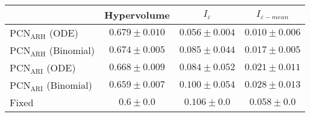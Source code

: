 \begin{tabular}{|l|c|c|c|}
    \hline
        & Hypervolume & $I_\varepsilon$ & $I_{\varepsilon-mean}$ \\
    \hline
        $\text{PCN}_\text{ARH}$ (ODE) & $\mathbf{0.679 \pm 0.010}$ & $\mathbf{0.056 \pm 0.004}$ & $\mathbf{0.010 \pm 0.006}$ \\
        \hline
        $\text{PCN}_\text{ARH}$ (Binomial) & $0.674 \pm 0.005$ & $0.085 \pm 0.044$ & $0.017 \pm 0.005$ \\
        \hline
        $\text{PCN}_\text{ARI}$ (ODE) & $0.668 \pm 0.009$ & $0.084 \pm 0.052$ & $0.021 \pm 0.011$ \\
        \hline
        $\text{PCN}_\text{ARI}$ (Binomial) & $0.659 \pm 0.007$ & $0.100 \pm 0.054$ & $0.028 \pm 0.013$ \\
        \hline
        Fixed & $0.6 \pm 0.0$ & $0.106 \pm 0.0$ & $0.058 \pm 0.0$ \\
        \hline
\end{tabular}
